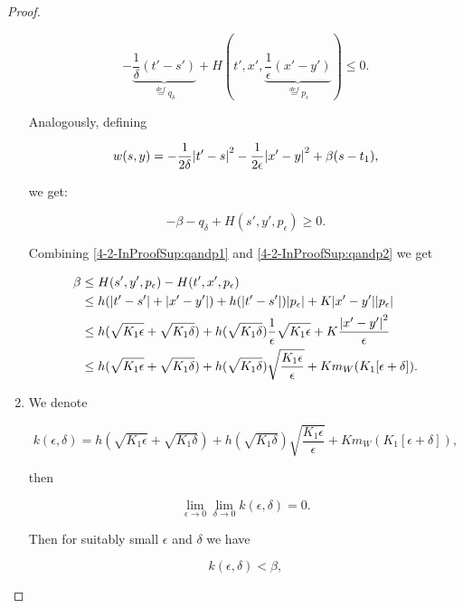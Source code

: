 \begin{proof}
\begin{enumerate}
        \begin{equation}\label{4-2-InProofSup:qandp1}-\underbrace{\frac{1}{\delta}(t'-s')}_{\overset{def}{=}q_{\delta}} + H(t',x',\underbrace{\frac{1}{\epsilon}(x'-y')}_{\overset{def}{=}p_{\epsilon}})\leq0.\end{equation}

        Analogously, defining 

        \[w(s,y) = -\frac{1}{2\delta}\abs{t'-s}^2 - \frac{1}{2\epsilon}\abs{x'-y}^2 + \beta(s-t_1),\]

        we get:

        \begin{equation}\label{4-2-InProofSup:qandp2}
            -\beta-q_{\delta}+H(s',y',p_{\epsilon})\geq0.
        \end{equation}

        Combining \ref{4-2-InProofSup:qandp1} and \ref{4-2-InProofSup:qandp2} we get

        \begin{align*}
            \beta & \leq H(s',y',p_{\epsilon}) - H(t',x',p_{\epsilon}) \\
            & \leq h(\abs{t'-s'} + \abs{x'-y'}) + h(\abs{t'-s'})\abs{p_{\epsilon}} + K\abs{x'-y'}\abs{p_{\epsilon}} \\
            & \leq h(\sqrt{K_1\epsilon} + \sqrt{K_1\delta}) + h(\sqrt{K_1\delta})\frac{1}{\epsilon}\sqrt{K_1\epsilon} + K\frac{\abs{x'-y'}^2}{\epsilon} \\
            & \leq h(\sqrt{K_1\epsilon} + \sqrt{K_1\delta}) + h(\sqrt{K_1\delta})\sqrt{\frac{K_1\epsilon}{\epsilon}} + Km_W(K_1[\epsilon+\delta]).
        \end{align*}
        
        \item We denote
        
        \begin{equation}\label{4-2-inproofSup:k}
            k(\epsilon,\delta) = h(\sqrt{K_1\epsilon} + \sqrt{K_1\delta}) + h(\sqrt{K_1\delta})\sqrt{\frac{K_1\epsilon}{\epsilon}} + Km_W(K_1[\epsilon+\delta]),
        \end{equation}

        then

        \[\lim_{\epsilon\to0}\lim_{\delta\to0} k(\epsilon,\delta) = 0.\]

        Then for suitably small $\epsilon$ and $\delta$ we have

        \[k(\epsilon,\delta) < \beta,\]


\end{enumerate}
\end{proof}
